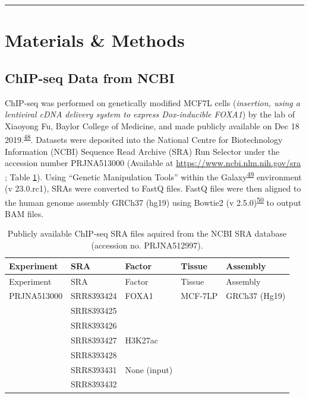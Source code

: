 \documentclass[
  11pt,
]{article}
\begin{document}
\begin{center}\rule{0.5\linewidth}{0.5pt}\end{center}

\hypertarget{materials-methods}{%
\section{Materials \& Methods}\label{materials-methods}}

\hypertarget{chip-seq-data-from-ncbi}{%
\subsection{ChIP-seq Data from NCBI}\label{chip-seq-data-from-ncbi}}

ChIP-seq was performed on genetically modified MCF7L cells (\emph{insertion, using a lentiviral cDNA delivery system to express Dox-inducible FOXA1}) by the lab of Xiaoyong Fu, Baylor College of Medicine, and made publicly available on Dec 18 2019.\textsuperscript{\protect\hyperlink{ref-fu2019}{48}}.
Datasets were deposited into the National Centre for Biotechnology Information (NCBI) Sequence Read Archive (SRA) Run Selector under the accession number PRJNA513000 (Available at \url{https://www.ncbi.nlm.nih.gov/sra} ; Table \ref{tab:data}).
Using ``Genetic Manipulation Tools'' within the Galaxy\textsuperscript{\protect\hyperlink{ref-thegala2022}{49}} environment (v 23.0.rc1), SRAs were converted to FastQ files.
FastQ files were then aligned to the human genome assembly GRCh37 (hg19) using Bowtie2 (v 2.5.0)\textsuperscript{\protect\hyperlink{ref-langmead2012}{50}} to output BAM files.

\begin{longtable}[]{@{}lllll@{}}
\caption{\label{tab:data}Publicly available ChIP-seq SRA files aquired from the NCBI SRA database (accession no. PRJNA512997).}\tabularnewline
\toprule()
Experiment & SRA & Factor & Tissue & Assembly \\
\midrule()
\endfirsthead
\toprule()
Experiment & SRA & Factor & Tissue & Assembly \\
\midrule()
\endhead
PRJNA513000 & SRR8393424 & FOXA1 & MCF-7LP & GRCh37 (Hg19) \\
& SRR8393425 & & & \\
& SRR8393426 & & & \\
& SRR8393427 & H3K27ac & & \\
& SRR8393428 & & & \\
& SRR8393431 & None (input) & & \\
& SRR8393432 & & & \\
\bottomrule()
\end{longtable}
\end{document}
